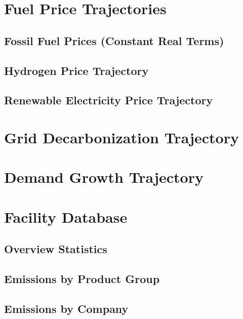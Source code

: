 \documentclass[11pt,a4paper]{report}
\begin{document}
\chapter{Fuel Price Trajectories}

\section{Fossil Fuel Prices (Constant Real Terms)}


\section{Hydrogen Price Trajectory}


\section{Renewable Electricity Price Trajectory}


\chapter{Grid Decarbonization Trajectory}


\chapter{Demand Growth Trajectory}


\chapter{Facility Database}

\section{Overview Statistics}
\section{Emissions by Product Group}
\section{Emissions by Company}
\end{document}
